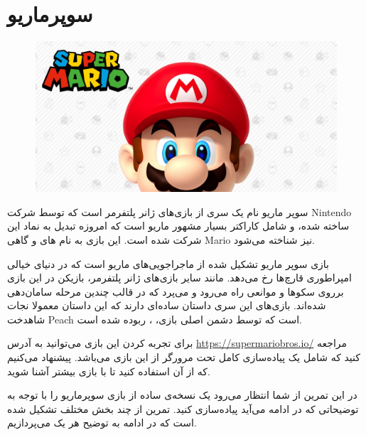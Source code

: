 \documentclass{utap}
\begin{document}
	\section{سوپرماریو}
	
	\begin{figure}[H]
		\begin{center}
			\includegraphics[width=\textwidth]{cover.jpg}
		\end{center}
	\end{figure}
سوپر ماریو نام یک سری از بازی‌های ژانر پلتفرمر  است که توسط شرکت Nintendo ساخته شده، و شامل کاراکتر بسیار مشهور ماریو است که امروزه تبدیل به نماد این شرکت شده است. این بازی به نام های  و گاهی Mario نیز شناخته می‌شود.

بازی سوپر ماریو تشکیل شده از ماجراجویی‌های ماریو است که در دنیای خیالی امپراطوری قارچ‌ها  رخ می‌دهد. مانند سایر بازی‌های ژانر پلتفرمر، بازیکن در این بازی برروی سکو‌ها و موانعی راه می‌رود و می‌پرد که در قالب چندین مرحله‌ سامان‌دهی شده‌اند. بازی‌های این سری داستان ساده‌ای دارند که این داستان معمولا نجات شاهدخت Peach است که توسط دشمن اصلی بازی، ، ربوده شده است.

برای تجربه کردن این بازی می‌توانید به آدرس \url{https://supermariobros.io/} مراجعه کنید که شامل یک پیاده‌سازی کامل تحت مرورگر از این بازی می‌باشد. پیشنهاد می‌کنیم که از آن استفاده کنید تا با بازی بیشتر آشنا شوید.

در این تمرین از شما انتظار می‌رود یک نسخه‌ی ساده از بازی سوپرماریو را با توجه به توضیحاتی که در ادامه می‌آید پیاده‌سازی کنید. تمرین از چند بخش مختلف تشکیل شده است که در ادامه به توضیح هر یک می‌پردازیم.
\end{document}
